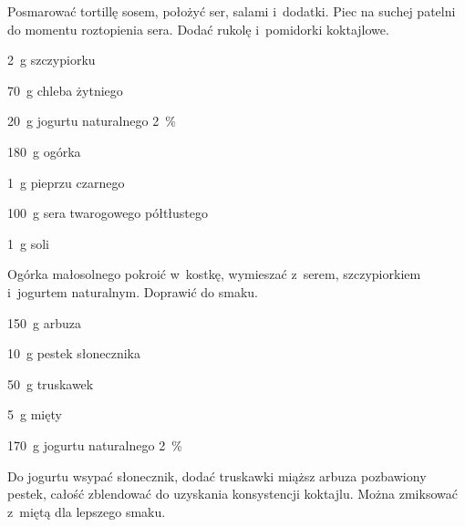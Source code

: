 \documentclass[../main.tex]{subfiles}
\begin{document}
Posmarować tortillę sosem, położyć ser, salami i~dodatki. Piec na suchej
patelni do momentu roztopienia sera. Dodać rukolę i~pomidorki koktajlowe.


\begin{Ingred}
    \item \qty{2}{\gram} szczypiorku
    \item \qty{70}{\gram} chleba żytniego
    \item \qty{20}{\gram} jogurtu naturalnego \qty{2}{\percent}
    \item \qty{180}{\gram} ogórka
    \item \qty{1}{\gram} pieprzu czarnego
    \item \qty{100}{\gram} sera twarogowego półtłustego
    \item \qty{1}{\gram} soli
\end{Ingred}

Ogórka małosolnego pokroić w~kostkę, wymieszać z~serem, szczypiorkiem
i~jogurtem naturalnym. Doprawić do smaku.


\begin{Ingred}
    \item \qty{150}{\gram} arbuza
    \item \qty{10}{\gram} pestek słonecznika
    \item \qty{50}{\gram} truskawek
    \item \qty{5}{\gram} mięty
    \item \qty{170}{\gram} jogurtu naturalnego \qty{2}{\percent}
\end{Ingred}

Do jogurtu wsypać słonecznik, dodać truskawki miąższ arbuza pozbawiony pestek,
całość zblendować do uzyskania konsystencji koktajlu. Można zmiksować z~miętą
dla lepszego smaku.

\end{document}
